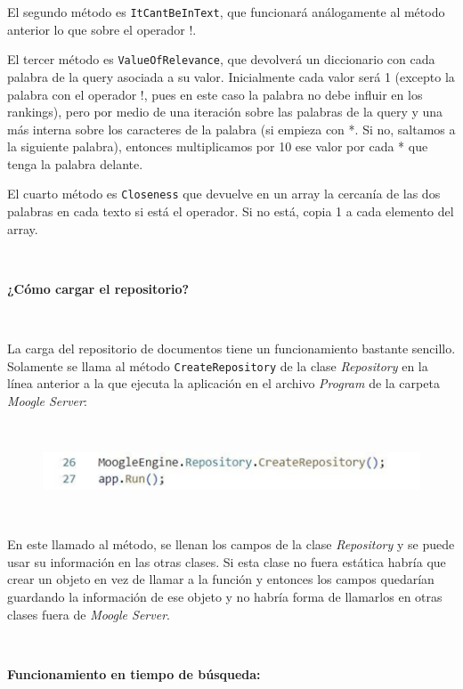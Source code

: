 \documentclass{article}
\begin{document}
El segundo método es {\texttt{ItCantBeInText}}, que funcionará análogamente al método anterior lo que
sobre el operador {!}.


El tercer método es {\texttt{ValueOfRelevance}}, que devolverá un diccionario con cada palabra de la
query asociada a su valor. Inicialmente cada valor será 1 (excepto la palabra con el operador
!, pues en este caso la palabra no debe influir en los rankings), pero por medio de una iteración
sobre las palabras de la query y una más interna sobre los caracteres de la palabra (si empieza
con {*}. Si no, saltamos a la siguiente palabra), entonces multiplicamos por 10 ese valor por cada
{*} que tenga la palabra delante.


El cuarto método es {\texttt{Closeness}} que devuelve en un array la cercanía de las dos palabras en cada texto si está
el operador. Si no está, copia 1 a cada elemento del array.


\


\begin{center}
	\large\textbf{¿Cómo cargar el repositorio?}
\end{center}

\


La carga del repositorio de documentos tiene un funcionamiento bastante sencillo. Solamente se llama
al método {\texttt{CreateRepository}} de la clase {\textit{Repository}} en la línea anterior a la que ejecuta la aplicación
en el archivo {\textit{Program}} de la carpeta {\textit{Moogle Server}}:


\


\begin{figure}[h]
	\begin{center}
		\includegraphics{img6.png}
	\end{center}
\end{figure}


\


En este llamado al método, se llenan los campos de la clase {\textit{Repository}} y se puede usar su
información en las otras clases. Si esta clase no fuera estática habría que crear un objeto en vez de
llamar a la función y entonces los campos quedarían guardando la información de ese objeto y no
habría forma de llamarlos en otras clases fuera de {\textit{Moogle Server}}.


\


\begin{center}
	\large\textbf{Funcionamiento en tiempo de búsqueda:}
\end{center}
\end{document}
